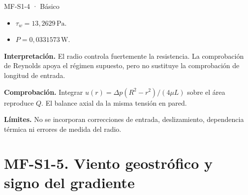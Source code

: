 \begin{studiumworked}{MF-S1-4 · Básico}
\begin{itemize}
\item $\tau_w=13{,}2629\,\mathrm{Pa}$.

\item $P=0{,}0331573\,\mathrm{W}$.

\end{itemize}

\textbf{Interpretación.} El radio controla fuertemente la resistencia. La comprobación de Reynolds apoya el régimen supuesto, pero no sustituye la comprobación de longitud de entrada.

\textbf{Comprobación.} Integrar $u(r)=\Delta p(R^2-r^2)/(4\mu L)$ sobre el área reproduce $Q$. El balance axial da la misma tensión en pared.

\textbf{Límites.} No se incorporan correcciones de entrada, deslizamiento, dependencia térmica ni errores de medida del radio.

\end{studiumworked}

\Needspace{.30\textheight}\section{MF-S1-5. Viento geostrófico y signo del gradiente}

